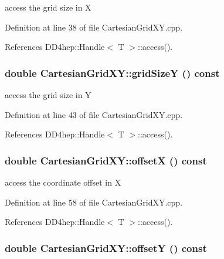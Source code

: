 access the grid size in X 

Definition at line 38 of file CartesianGridXY.cpp.

References DD4hep::Handle$<$ T $>$::access().\hypertarget{class_d_d4hep_1_1_geometry_1_1_cartesian_grid_x_y_a3021db1724740a17be12ccfcf90d24e1}{
\subsubsection[{gridSizeY}]{\setlength{\rightskip}{0pt plus 5cm}double CartesianGridXY::gridSizeY () const}}
\label{class_d_d4hep_1_1_geometry_1_1_cartesian_grid_x_y_a3021db1724740a17be12ccfcf90d24e1}


access the grid size in Y 

Definition at line 43 of file CartesianGridXY.cpp.

References DD4hep::Handle$<$ T $>$::access().\hypertarget{class_d_d4hep_1_1_geometry_1_1_cartesian_grid_x_y_adb38a4e807922c1992ed280738e5a262}{
\subsubsection[{offsetX}]{\setlength{\rightskip}{0pt plus 5cm}double CartesianGridXY::offsetX () const}}
\label{class_d_d4hep_1_1_geometry_1_1_cartesian_grid_x_y_adb38a4e807922c1992ed280738e5a262}


access the coordinate offset in X 

Definition at line 58 of file CartesianGridXY.cpp.

References DD4hep::Handle$<$ T $>$::access().\hypertarget{class_d_d4hep_1_1_geometry_1_1_cartesian_grid_x_y_aad5782f732bffc9d6a6eb4abc2142d5c}{
\subsubsection[{offsetY}]{\setlength{\rightskip}{0pt plus 5cm}double CartesianGridXY::offsetY () const}}
\label{class_d_d4hep_1_1_geometry_1_1_cartesian_grid_x_y_aad5782f732bffc9d6a6eb4abc2142d5c}


